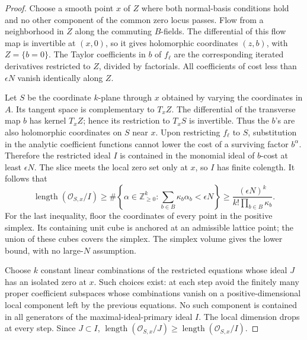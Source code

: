 \documentclass[11pt]{article}
\theoremstyle{definition}
\theoremstyle{remark}
\newcommand{\N}{\mathbb Z_{\ge0}}
\newcommand{\len}{\operatorname{length}}
\newcommand{\OO}{\mathcal O}
\numberwithin{equation}{section}
\begin{document}
\begin{proof}
Choose a smooth point \(x\) of \(Z\) where both normal-basis
conditions hold and no other component of the common zero locus
passes. Flow from a neighborhood in \(Z\) along the commuting
\(B\)-fields. The differential of this flow map is invertible at
\((x,0)\), so it gives holomorphic coordinates \((z,b)\), with
\(Z=\{b=0\}\). The Taylor coefficients in \(b\) of \(f_\ell\)
are the corresponding iterated derivatives restricted to \(Z\),
divided by factorials. All coefficients of cost less than
\(\epsilon N\) vanish identically along \(Z\).

Let \(S\) be the coordinate \(k\)-plane through \(x\) obtained by
varying the coordinates in \(A\). Its tangent space is complementary
to \(T_xZ\). The differential of the transverse map \(b\) has
kernel \(T_xZ\); hence its restriction to \(T_xS\) is invertible.
Thus the \(b\)'s are also holomorphic coordinates on \(S\) near \(x\).
Upon restricting \(f_\ell\) to \(S\), substitution in the analytic
coefficient functions cannot lower the cost of a surviving factor
\(b^\alpha\). Therefore the restricted ideal \(I\) is contained
in the monomial ideal of \(b\)-cost at least \(\epsilon N\).
The slice meets the local zero set only at \(x\), so \(I\) has
finite colength. It follows that
\begin{equation}\label{eq:lengthlower}
 \len(\OO_{S,x}/I)\ge
 \#\left\{\alpha\in\N^k:
       \sum_{b\in B}\kappa_b\alpha_b<\epsilon N\right\}
 \ge\frac{(\epsilon N)^k}{k!\prod_{b\in B}\kappa_b}.
\end{equation}
For the last inequality, floor the coordinates of every point in the
positive simplex. Its containing unit cube is anchored at an admissible
lattice point; the union of these cubes covers the simplex. The
simplex volume gives the lower bound, with no large-\(N\) assumption.

Choose \(k\) constant linear combinations of the restricted equations
whose ideal \(J\) has an isolated zero at \(x\). Such choices exist:
at each step avoid the finitely many proper coefficient subspaces
whose combinations vanish on a positive-dimensional local component
left by the previous equations. No such component is contained in all
generators of the maximal-ideal-primary ideal \(I\). The local
dimension drops at every step. Since \(J\subset I\),
\(\len(\OO_{S,x}/J)\ge\len(\OO_{S,x}/I)\).


\end{proof}
\end{document}
